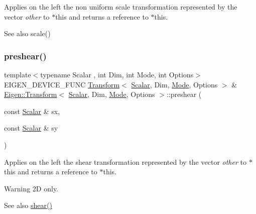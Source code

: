 Applies on the left the non uniform scale transformation represented by the vector {\itshape other} to {\ttfamily $\ast$this} and returns a reference to {\ttfamily $\ast$this}. \begin{DoxySeeAlso}{See also}
scale() 
\end{DoxySeeAlso}
\mbox{\label{class_eigen_1_1_transform_a2540957bb590f16260689bcf32d28a7a}} 
\subsubsection{\texorpdfstring{preshear()}{preshear()}}
{\footnotesize\ttfamily template$<$typename Scalar , int Dim, int Mode, int Options$>$ \\
E\+I\+G\+E\+N\+\_\+\+D\+E\+V\+I\+C\+E\+\_\+\+F\+U\+NC \mbox{\hyperlink{class_eigen_1_1_transform}{Transform}}$<$ \mbox{\hyperlink{class_eigen_1_1_transform_a4e69ced9d651745b8ed4eda46f41795d}{Scalar}}, Dim, \mbox{\hyperlink{struct_mode}{Mode}}, Options $>$ \& \mbox{\hyperlink{class_eigen_1_1_transform}{Eigen\+::\+Transform}}$<$ \mbox{\hyperlink{class_eigen_1_1_transform_a4e69ced9d651745b8ed4eda46f41795d}{Scalar}}, Dim, \mbox{\hyperlink{struct_mode}{Mode}}, Options $>$\+::preshear (\begin{DoxyParamCaption}\item[{const \mbox{\hyperlink{class_eigen_1_1_transform_a4e69ced9d651745b8ed4eda46f41795d}{Scalar}} \&}]{sx,  }\item[{const \mbox{\hyperlink{class_eigen_1_1_transform_a4e69ced9d651745b8ed4eda46f41795d}{Scalar}} \&}]{sy }\end{DoxyParamCaption})}

Applies on the left the shear transformation represented by the vector {\itshape other} to {\ttfamily $\ast$this} and returns a reference to {\ttfamily $\ast$this}. \begin{DoxyWarning}{Warning}
2D only. 
\end{DoxyWarning}
\begin{DoxySeeAlso}{See also}
\mbox{\hyperlink{class_eigen_1_1_transform_a2999a84269a4a08d3af8a3ad1b0598ef}{shear()}} 
\end{DoxySeeAlso}
\mbox{\label{class_eigen_1_1_transform_a9ceb0c150d540e9252d57a5862dbe06f}} 
